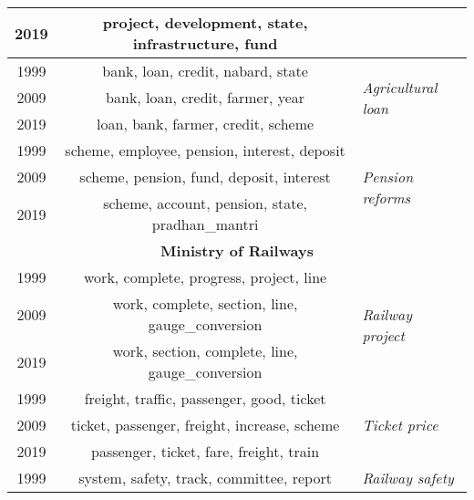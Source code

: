 \documentclass[10pt, a4paper]{article}
\begin{document}
\begin{table}[!htbp]
\begin{adjustbox}{width=1\linewidth}
\begin{tabular}{|c|c|l|}
        2019 & project, development, state, infrastructure, fund & \\ \hline \hline
        
        1999 & bank, loan, credit, nabard, state & \multirow{3}{2cm}{\textit{Agricultural loan}} \\ \cline{1-2}
        
        2009 & bank, loan, credit, farmer, year & \\ \cline{1-2}
        
        2019 & loan, bank, farmer, credit, scheme & \\ \hline \hline
        
        1999 & scheme, employee, pension, interest, deposit & \multirow{3}{2cm}{\textit{Pension reforms}} \\ \cline{1-2}
        
        2009 & scheme, pension, fund, deposit, interest & \\ \cline{1-2}
        
        2019 & scheme, account, pension, state, pradhan\_mantri & \\ \hline 
        
        
        \multicolumn{3}{|c|}{\textbf{Ministry of Railways}} \\ \hline
        1999 & work, complete, progress, project, line & \multirow{3}{2cm}{\textit{Railway project}} \\ \cline{1-2}
        
        2009 & work, complete, section, line, gauge\_conversion & \\ \cline{1-2}
        
        2019 & work, section, complete, line, gauge\_conversion & \\ \hline \hline
        
        1999 & freight, traffic, passenger, good, ticket & \multirow{3}{2cm}{\textit{Ticket price}} \\ \cline{1-2}
        
        2009 & ticket, passenger, freight, increase, scheme & \\ \cline{1-2}
        
        2019 & passenger, ticket, fare, freight, train & \\ \hline \hline
        
        1999 & system, safety, track, committee, report & \multirow{3}{2cm}{\textit{Railway safety}} \\ \cline{1-2}
        

\end{tabular}
\end{adjustbox}
\end{table}
\end{document}
